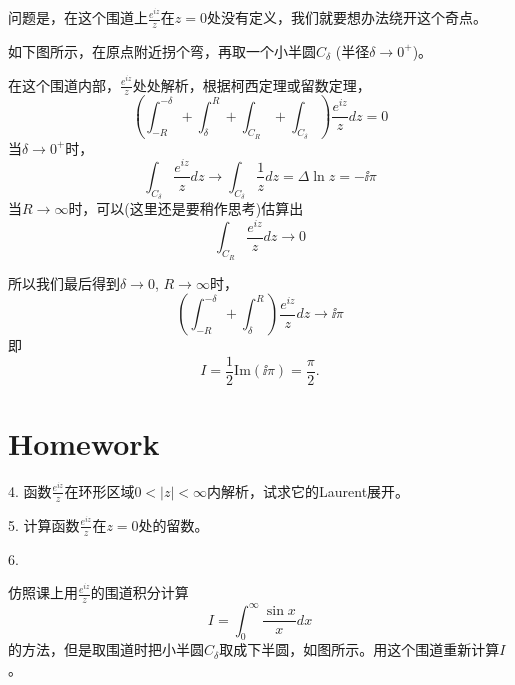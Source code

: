 \documentclass[CJK]{beamer}
\begin{document}
\begin{frame}
  \bch
  问题是，在这个围道上$\frac{e^{iz}}{z}$在$z=0$处没有定义，我们就要想办法绕开这个奇点。

  如下图所示，在原点附近拐个弯，再取一个小半圆$C_\delta$ (半径$\delta \rightarrow 0^+$)。
  

  \ech
\end{frame}


\begin{frame}
  \bch  
{\small  在这个围道内部，$\frac{e^{iz}}{z}$处处解析，根据柯西定理或留数定理，
  $$\left(\int_{-R}^{-\delta} + \int_{\delta}^{R} + \int_{C_R} + \int_{C_\delta}\right)\frac{e^{iz}}{z} dz = 0  $$
 当$\delta \rightarrow 0^+$时，
 $$\int_{C_\delta} \frac{e^{iz}}{z}dz  \rightarrow \int_{C_\delta} \frac{1}{z}dz = \Delta \ln z = - \ii \pi $$
 当$R\rightarrow \infty$时，可以(这里还是要稍作思考)估算出
 $$\int_{C_R} \frac{e^{iz}}{z}dz \rightarrow 0$$}
  \ech
\end{frame}

\begin{frame}
  \bch  
    所以我们最后得到$\delta\rightarrow 0$, $R\rightarrow \infty$时，
    $$\left(\int_{-R}^{-\delta} + \int_{\delta}^{R}\right)  \frac{e^{iz}}{z} dz \rightarrow \ii\pi $$
    即
    $$ I = \frac{1}{2}\mathrm{Im}(\ii\pi) = \frac{\pi}{2}.$$
  \ech
\end{frame}

\section{Homework}
\begin{frame}
  \bch
  \bitem
\item[4.]{函数$\frac{e^{iz}}{z}$在环形区域$0<|z|<\infty$内解析，试求它的Laurent展开。}
\item[5.]{计算函数$\frac{e^{iz}}{z}$在$z=0$处的留数。}
\item[6.]{仿照课上用$\frac{e^{iz}}{z}$的围道积分计算
  $$I=\int_0^{\infty}\frac{\sin x}{x}dx$$
  的方法，但是取围道时把小半圆$C_\delta$取成下半圆，如图所示。用这个围道重新计算$I$。
  
}
  \eitem
  \ech  
\end{frame}
\end{document}
